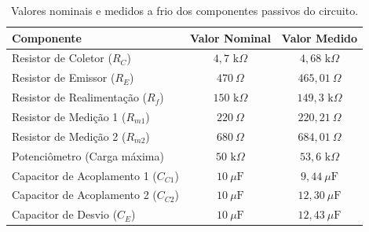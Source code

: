 \begin{table}[htbp]
	\centering
	\caption{Valores nominais e medidos a frio dos componentes passivos do circuito.}
	\label{tab:afericao_frio}
	\begin{tabular}{lcc}
		\toprule
		\textbf{Componente} & \textbf{Valor Nominal} & \textbf{Valor Medido} \\
		\midrule
		Resistor de Coletor ($R_C$) & $4,7\text{ k}\Omega$ & $4,68\text{ k}\Omega$ \\
		Resistor de Emissor ($R_E$) & $470\ \Omega$ & $465,01\ \Omega$ \\
		Resistor de Realimentação ($R_f$) & $150\text{ k}\Omega$ & $149,3\text{ k}\Omega$ \\
		Resistor de Medição 1 ($R_{m1}$) & $220\ \Omega$ & $220,21\ \Omega$ \\
		Resistor de Medição 2 ($R_{m2}$) & $680\ \Omega$ & $684,01\ \Omega$ \\
		Potenciômetro (Carga máxima) & $50\text{ k}\Omega$ & $53,6\text{ k}\Omega$ \\
		\midrule
		Capacitor de Acoplamento 1 ($C_{C1}$) & $10\ \mu\text{F}$ & $9,44\ \mu\text{F}$ \\
		Capacitor de Acoplamento 2 ($C_{C2}$) & $10\ \mu\text{F}$ & $12,30\ \mu\text{F}$ \\
		Capacitor de Desvio ($C_E$) & $10\ \mu\text{F}$ & $12,43\ \mu\text{F}$ \\
		\bottomrule
	\end{tabular}
\end{table}